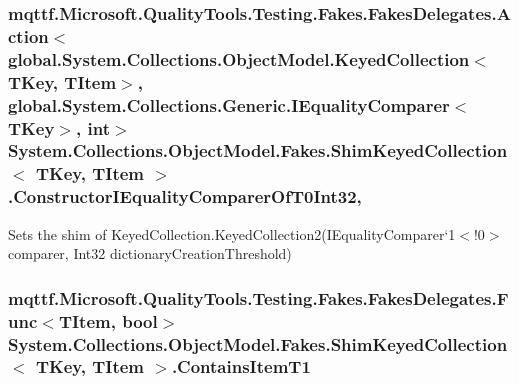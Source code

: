 \hypertarget{class_system_1_1_collections_1_1_object_model_1_1_fakes_1_1_shim_keyed_collection_3_01_t_key_00_01_t_item_01_4_a1d4e93aa336cd01377e4ed0ccf1072dc}{
\subsubsection[{Constructor\-I\-Equality\-Comparer\-Of\-T0\-Int32}]{\setlength{\rightskip}{0pt plus 5cm}mqttf.\-Microsoft.\-Quality\-Tools.\-Testing.\-Fakes.\-Fakes\-Delegates.\-Action$<$global.\-System.\-Collections.\-Object\-Model.\-Keyed\-Collection$<$T\-Key, T\-Item$>$, global.\-System.\-Collections.\-Generic.\-I\-Equality\-Comparer$<$T\-Key$>$, int$>$ System.\-Collections.\-Object\-Model.\-Fakes.\-Shim\-Keyed\-Collection$<$ T\-Key, T\-Item $>$.Constructor\-I\-Equality\-Comparer\-Of\-T0\-Int32\hspace{0.3cm}{\ttfamily [static]}, {\ttfamily [set]}}}\label{class_system_1_1_collections_1_1_object_model_1_1_fakes_1_1_shim_keyed_collection_3_01_t_key_00_01_t_item_01_4_a1d4e93aa336cd01377e4ed0ccf1072dc}


Sets the shim of Keyed\-Collection{.\-Keyed\-Collection}2(I\-Equality\-Comparer`1$<$!0$>$ comparer, Int32 dictionary\-Creation\-Threshold)

\hypertarget{class_system_1_1_collections_1_1_object_model_1_1_fakes_1_1_shim_keyed_collection_3_01_t_key_00_01_t_item_01_4_a8b7be776d7bbf7235e9d702a1370a608}{
\subsubsection[{Contains\-Item\-T1}]{\setlength{\rightskip}{0pt plus 5cm}mqttf.\-Microsoft.\-Quality\-Tools.\-Testing.\-Fakes.\-Fakes\-Delegates.\-Func$<$T\-Item, bool$>$ System.\-Collections.\-Object\-Model.\-Fakes.\-Shim\-Keyed\-Collection$<$ T\-Key, T\-Item $>$.Contains\-Item\-T1\hspace{0.3cm}{\ttfamily [set]}}}\label{class_system_1_1_collections_1_1_object_model_1_1_fakes_1_1_shim_keyed_collection_3_01_t_key_00_01_t_item_01_4_a8b7be776d7bbf7235e9d702a1370a608}


